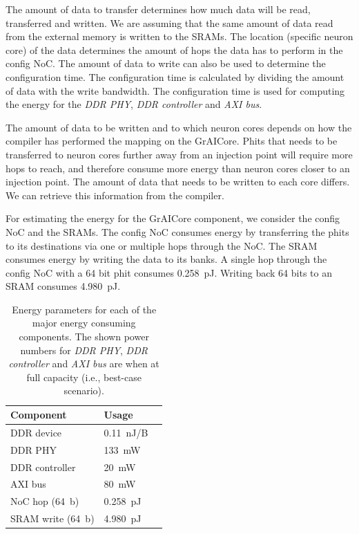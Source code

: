 The amount of data to transfer determines how much data will be read, transferred and written.
We are assuming that the same amount of data read from the external memory is written to the SRAMs.
The location (specific neuron core) of the data determines the amount of hops the data has to perform in the config NoC.
The amount of data to write can also be used to determine the configuration time.
The configuration time is calculated by dividing the amount of data with the write bandwidth.
The configuration time is used for computing the energy for the \textit{DDR PHY}, \textit{DDR controller} and \textit{AXI bus}.

The amount of data to be written and to which neuron cores depends on how the compiler has performed the mapping on the GrAICore. %
Phits that needs to be transferred to neuron cores further away from an injection point will require more hops to reach, and therefore consume more energy than neuron cores closer to an injection point.
The amount of data that needs to be written to each core differs.
We can retrieve this information from the compiler.

For estimating the energy for the GrAICore component, we consider the config NoC and the SRAMs.
The config NoC consumes energy by transferring the phits to its destinations via one or multiple hops through the NoC.
The SRAM consumes energy by writing the data to its banks.
A single hop through the config NoC with a 64 bit phit consumes \SI{0.258}{pJ}.
Writing back 64 bits to an SRAM consumes \SI{4.980}{pJ}.

\begin{table}[hbtp]
\centering
\begin{tabular}{@{}lll@{}}
\toprule
\textbf{Component}      & \textbf{Usage}  &  \\
\midrule
DDR device              & \SI{0.11}{nJ/B} &  \\
DDR PHY                 & \SI{133}{mW}    &  \\
DDR controller          & \SI{20}{mW}     &  \\
AXI bus                 & \SI{80}{mW}     &  \\
NoC hop (\SI{64}{b})    & \SI{0.258}{pJ}  &  \\
SRAM write (\SI{64}{b}) & \SI{4.980}{pJ}  &  \\
\bottomrule
\end{tabular}
\caption{Energy parameters for each of the major energy consuming components. The shown power numbers for \textit{DDR PHY}, \textit{DDR controller} and \textit{AXI bus} are when at full capacity (i.e., best-case scenario).}
\label{tab:energy_parameters_ddr}
\end{table}

